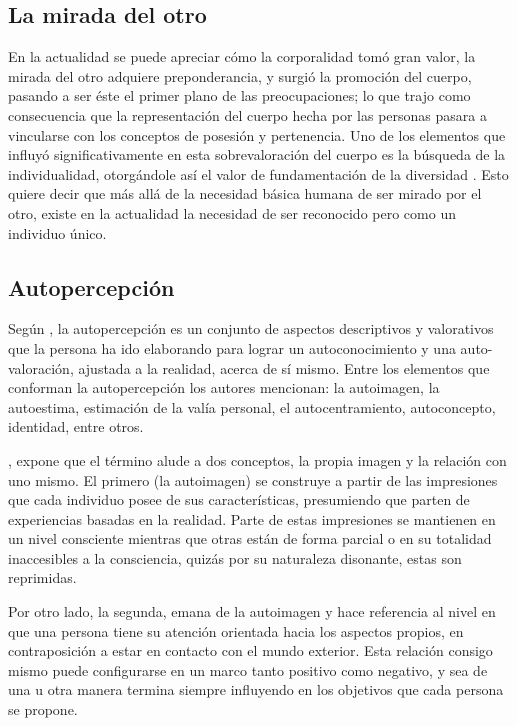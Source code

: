 \subsection{La mirada del otro}

En la actualidad se puede apreciar cómo la corporalidad tomó gran valor, la
mirada del otro adquiere preponderancia, y surgió la promoción del cuerpo,
pasando a ser éste el primer plano de las preocupaciones; lo que trajo como
consecuencia que la representación del cuerpo hecha por las personas pasara a
vincularse con los conceptos de posesión y pertenencia. Uno de los elementos que
influyó significativamente en esta sobrevaloración del cuerpo es la búsqueda de
la individualidad, otorgándole así el valor de fundamentación de la diversidad
\parencite{LeBreton1994}. Esto quiere decir que más allá de la necesidad básica
humana de ser mirado por el otro, existe en la actualidad  la necesidad de ser
reconocido pero como un individuo único.

\subsection{Autopercepción}

Según \textcite{Exner1998}, la autopercepción es un conjunto de aspectos
descriptivos y valorativos que la persona ha ido elaborando para lograr un
autoconocimiento y una auto-valoración, ajustada a la realidad, acerca de sí
mismo. Entre los elementos que conforman la autopercepción los autores
mencionan: la autoimagen, la autoestima, estimación de la valía personal, el
autocentramiento, autoconcepto, identidad, entre otros.

\textcite{Exner2000}, expone que el término alude a dos conceptos, la propia
imagen y la relación con uno mismo. El primero (la autoimagen) se construye a
partir de las impresiones que cada individuo posee de sus características,
presumiendo que parten de experiencias basadas en la realidad. Parte de estas
impresiones se mantienen en un nivel consciente mientras que otras están de
forma parcial o en su totalidad inaccesibles a la consciencia, quizás por su
naturaleza disonante, estas son reprimidas.

Por otro lado, la segunda, emana de la autoimagen y hace referencia al nivel en
que una persona tiene su atención orientada hacia los aspectos propios, en
contraposición a estar en contacto con el mundo exterior. Esta relación consigo
mismo puede configurarse en un marco tanto positivo como negativo, y sea de una
u otra manera termina siempre influyendo en los objetivos que cada persona se
propone.

